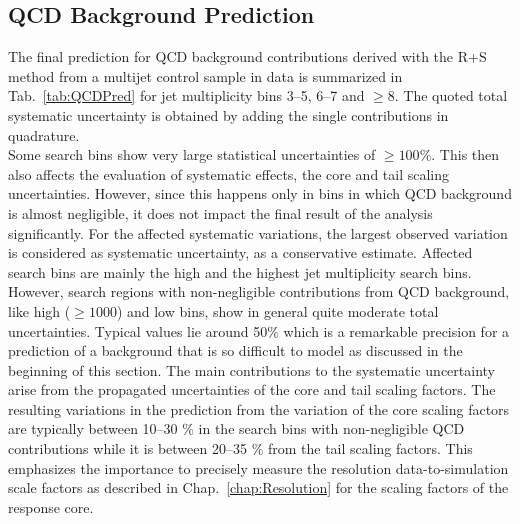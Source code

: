 \subsection{QCD Background Prediction}
\label{subsec:RA2_qcd_pred}
The final prediction for QCD background contributions derived with the R+S method from a multijet control sample in data is summarized in Tab.~\ref{tab:QCDPred} for jet multiplicity bins 3--5, 6--7 and $\ge 8$. The quoted total systematic uncertainty is obtained by adding the single contributions in quadrature. \\
Some search bins show very large statistical uncertainties of $\geq 100 \%$. This then also affects the evaluation of systematic effects, \eg the core and tail scaling uncertainties. However, since this happens only in bins in which QCD background is almost negligible, it does not impact the final result of the analysis significantly. For the affected systematic variations, the largest observed variation is considered as systematic uncertainty, as a conservative estimate. Affected search bins are mainly the high \MHT and the highest jet multiplicity search bins. \\
However, search regions with non-negligible contributions from QCD background, like high \HT ($\ge 1000$\gev) and low \MHT bins, show in general quite moderate total uncertainties. Typical values lie around 50\% which is a remarkable precision for a prediction of a background that is so difficult to model as discussed in the beginning of this section. The main contributions to the systematic uncertainty arise from the propagated uncertainties of the core and tail scaling factors. The resulting variations in the prediction from the variation of the core scaling factors are typically between 10--30 $\%$ in the search bins with non-negligible QCD contributions while it is between 20--35 $\%$ from the tail scaling factors. This emphasizes the importance to precisely measure the resolution data-to-simulation scale factors as described in Chap.~\ref{chap:Resolution} for the scaling factors of the response core. 
